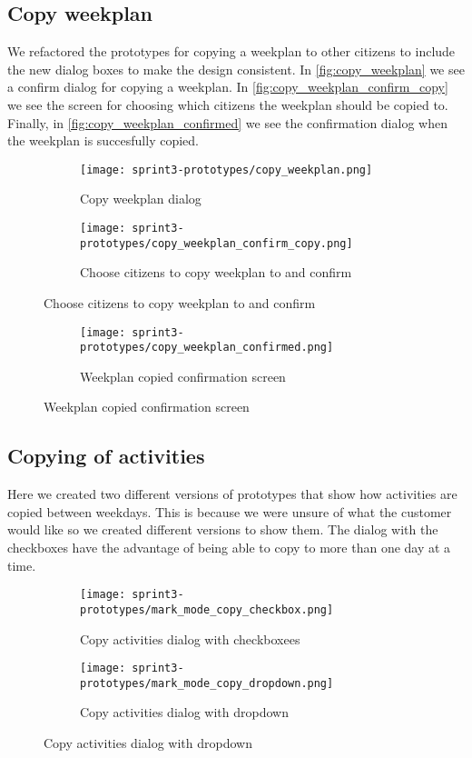 \subsection{Copy weekplan}
We refactored the prototypes for copying a weekplan to other citizens to include the new dialog boxes to make the design consistent. In \autoref{fig:copy_weekplan} we see a confirm dialog for copying a weekplan. In \autoref{fig:copy_weekplan_confirm_copy} we see the screen for choosing which citizens the weekplan should be copied to. Finally, in \autoref{fig:copy_weekplan_confirmed} we see the confirmation dialog when the weekplan is succesfully copied.
\begin{figure}[H]
    \begin{subfigure}{0.5\textwidth}
    \texttt{[image: sprint3-prototypes/copy\_weekplan.png]} 
    \caption{Copy weekplan dialog}
    \label{fig:copy_weekplan}
    \end{subfigure}
    \begin{subfigure}{0.5\textwidth}
        \texttt{[image: sprint3-prototypes/copy\_weekplan\_confirm\_copy.png]}
    \caption{Choose citizens to copy weekplan to and confirm}
    \label{fig:copy_weekplan_confirm_copy}
    \end{subfigure} 
\end{figure}

\begin{figure}[H]
    \begin{subfigure}{0.5\textwidth}
    \texttt{[image: sprint3-prototypes/copy\_weekplan\_confirmed.png]} 
    \caption{Weekplan copied confirmation screen}
    \label{fig:copy_weekplan_confirmed}
    \end{subfigure}
\end{figure}

\subsection{Copying of activities}
Here we created two different versions of prototypes that show how activities are copied between weekdays. This is because we were unsure of what the customer would like so we created different versions to show them. The dialog with the checkboxes have the advantage of being able to copy to more than one day at a time.
\begin{figure}[H]
    \begin{subfigure}{0.5\textwidth}
    \texttt{[image: sprint3-prototypes/mark\_mode\_copy\_checkbox.png]} 
    \caption{Copy activities dialog with checkboxees}
    \label{fig:mark_mode_copy_checkbox}
    \end{subfigure}
    \begin{subfigure}{0.5\textwidth}
        \texttt{[image: sprint3-prototypes/mark\_mode\_copy\_dropdown.png]}
    \caption{Copy activities dialog with dropdown}
    \label{fig:mark_mode_copy_dropdown}
    \end{subfigure} 
\end{figure}

